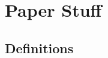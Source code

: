 \documentclass{article}
\begin{document}
\maketitle








\section{Paper Stuff}


\subsection*{Definitions}
\end{document}
